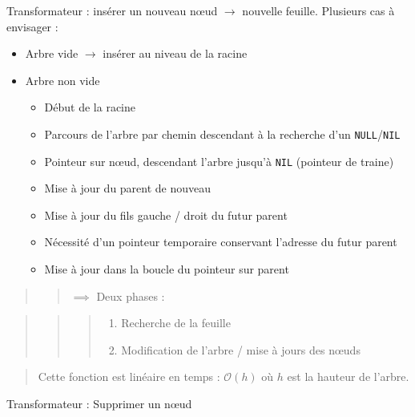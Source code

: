 Transformateur : insérer un nouveau nœud \(\to\) nouvelle feuille.
Plusieurs cas à envisager :

\begin{itemize}
\item
  Arbre vide \(\to\) insérer au niveau de la racine
\item
  Arbre non vide

  \begin{itemize}
  \tightlist
  \item
    Début de la racine
  \item
    Parcours de l'arbre par chemin descendant à la recherche d'un
    \texttt{NULL}/\texttt{NIL}
  \item
    Pointeur sur nœud, descendant l'arbre jusqu'à \texttt{NIL} (pointeur
    de traine)
  \item
    Mise à jour du parent de nouveau
  \item
    Mise à jour du fils gauche / droit du futur parent
  \item
    Nécessité d'un pointeur temporaire conservant l'adresse du futur
    parent
  \item
    Mise à jour dans la boucle du pointeur sur parent
  \end{itemize}
\end{itemize}

\begin{quote}
\begin{quote}
\(\implies\) Deux phases :
\end{quote}
\end{quote}

\begin{quote}
\begin{quote}
\begin{quote}
\begin{enumerate}
\def\labelenumi{\arabic{enumi}.}
\tightlist
\item
  Recherche de la feuille
\item
  Modification de l'arbre / mise à jours des nœuds
\end{enumerate}
\end{quote}
\end{quote}
\end{quote}

\begin{quote}
Cette fonction est linéaire en temps : \(\mathcal{O}(h)\) où \(h\) est
la hauteur de l'arbre.
\end{quote}

Transformateur : Supprimer un nœud

